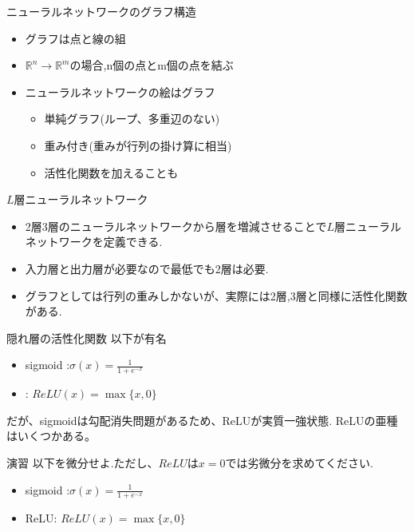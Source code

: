 \begin{frame}[fragile]{ニューラルネットワークのグラフ構造}
\begin{itemize}
\item グラフは点と線の組
\item $\mathbb{R}^n \to \mathbb{R}^{m}$の場合,n個の点とm個の点を結ぶ
\item ニューラルネットワークの絵はグラフ
  \begin{itemize}
  \item 単純グラフ(ループ、多重辺のない)
  \item 重み付き(重みが行列の掛け算に相当)
  \item 活性化関数を加えることも
  \end{itemize}
\end{itemize}

\end{frame}


\begin{frame}[fragile]{$L$層ニューラルネットワーク}
\begin{itemize}
  \item 2層3層のニューラルネットワークから層を増減させることで$L$層ニューラルネットワークを定義できる.
  \item 入力層と出力層が必要なので最低でも2層は必要.
  \item グラフとしては行列の重みしかないが、実際には2層,3層と同様に活性化関数がある.
\end{itemize}
\end{frame}


\begin{frame}[fragile]{隠れ層の活性化関数}
以下が有名
\begin{itemize}
\item sigmoid :$\sigma(x) = \frac{1}{1 + e^{-x}}$
\item: $ReLU(x) = \max\{x, 0\}$
\end{itemize}

だが、sigmoidは勾配消失問題があるため、ReLUが実質一強状態.
ReLUの亜種はいくつかある。
\end{frame}


\begin{frame}[fragile]{演習}
以下を微分せよ.ただし、$ReLU$は$x=0$では劣微分を求めてください.
\begin{itemize}
\item  sigmoid :$\sigma(x) = \frac{1}{1 + e^{-x}}$
\item ReLU: $ReLU(x) = \max\{x, 0\}$
\end{itemize}
\end{frame}


